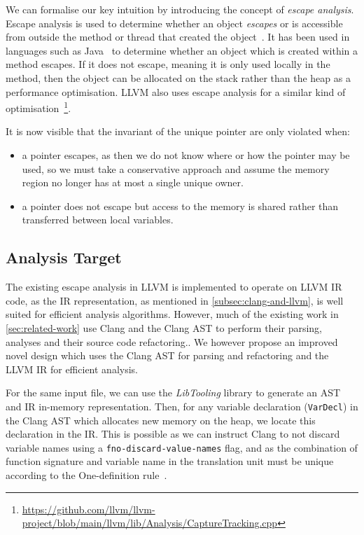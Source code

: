 \documentclass{mpaper}
\begin{document}
    We can formalise our key intuition by introducing the concept of \emph{escape analysis}.
    Escape analysis is used to determine whether an object \emph{escapes} or is accessible from outside the method or thread that created the object~\cite{Choi1999}.
    It has been used in languages such as Java~\cite{Choi1999} to determine whether an object which is created within a method escapes.
    If it does not escape, meaning it is only used locally in the method, then the object can be allocated on the stack rather than the heap as a performance optimisation.
    LLVM also uses escape analysis for a similar kind of optimisation~\footnote{\url{https://github.com/llvm/llvm-project/blob/main/llvm/lib/Analysis/CaptureTracking.cpp}}.
    
    It is now visible that the invariant of the unique pointer are only violated when:
    \begin{itemize}
        \item a pointer escapes, as then we do not know where or how the pointer may be used, so we must take a conservative approach and assume the memory region no longer has at most a single unique owner.
        \item a pointer does not escape but access to the memory is shared rather than transferred between local variables. 
    \end{itemize}
    
    \subsection{Analysis Target}\label{subsec:methodology-analysistarget}
    
    The existing escape analysis in LLVM is implemented to operate on LLVM IR code, as the IR representation, as mentioned in \autoref{subsec:clang-and-llvm}, is well suited for efficient analysis algorithms. 
    However, much of the existing work in \autoref{sec:related-work} use Clang and the Clang AST to perform their parsing, analyses and their source code refactoring..
    We however propose an improved novel design which uses the Clang AST for parsing and refactoring and the LLVM IR for efficient analysis.
    
    For the same input file, we can use the \emph{LibTooling} library to generate an AST and IR in-memory representation.
    Then, for any variable declaration (\texttt{VarDecl}) in the Clang AST which allocates new memory on the heap, we locate this declaration in the IR.
    This is possible as we can instruct Clang to not discard variable names using a \texttt{fno-discard-value-names} flag, and as the combination of function signature and variable name in the translation unit must be unique according to the One-definition rule~\cite{C++17}. 
    
\end{document}
